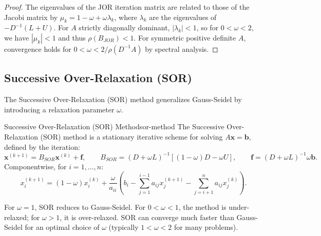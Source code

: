 \begin{proof}
    The eigenvalues of the JOR iteration matrix are related to those of the Jacobi matrix by $\mu_k = 1 - \omega + \omega \lambda_k$, where $\lambda_k$ are the eigenvalues of $-D^{-1}(L+U)$. For $A$ strictly diagonally dominant, $|\lambda_k| < 1$, so for $0 < \omega < 2$, we have $|\mu_k| < 1$ and thus $\rho(B_{JOR}) < 1$. For symmetric positive definite $A$, convergence holds for $0 < \omega < 2/\rho(D^{-1}A)$ by spectral analysis.
\end{proof}

\subsection{Successive Over-Relaxation (SOR)}
The Successive Over-Relaxation (SOR) method generalizes Gauss-Seidel by introducing a relaxation parameter \(\omega\).

\begin{definition}{Successive Over-Relaxation (SOR) Method}{sor-method}
    The Successive Over-Relaxation (SOR) method is a stationary iterative scheme for solving \(A\mathbf{x} = \mathbf{b}\), defined by the iteration:
    \[
        \mathbf{x}^{(k+1)} = B_{SOR} \mathbf{x}^{(k)} + \mathbf{f}, \qquad
        B_{SOR} = (D + \omega L)^{-1} \left[(1-\omega)D - \omega U\right], \qquad
        \mathbf{f} = (D + \omega L)^{-1} \omega \mathbf{b}.
    \]
    Componentwise, for \(i = 1, \ldots, n\):
    \begin{equation*}
        x_i^{(k+1)} = (1-\omega)x_i^{(k)} + \frac{\omega}{a_{ii}}\left(b_i - \sum_{j=1}^{i-1} a_{ij} x_j^{(k+1)} - \sum_{j=i+1}^n a_{ij} x_j^{(k)}\right).
    \end{equation*}
\end{definition}

For \(\omega = 1\), SOR reduces to Gauss-Seidel. For \(0 < \omega < 1\), the method is under-relaxed; for \(\omega > 1\), it is over-relaxed. SOR can converge much faster than Gauss-Seidel for an optimal choice of \(\omega\) (typically \(1 < \omega < 2\) for many problems).

